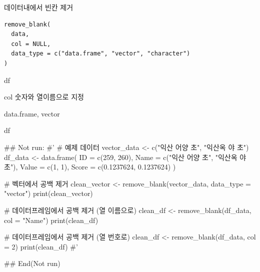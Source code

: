 \documentclass[a4paper]{book}
\begin{document}
%
\begin{Description}
데이터내에서 빈칸 제거
\end{Description}
%
\begin{Usage}
\begin{verbatim}
remove_blank(
  data,
  col = NULL,
  data_type = c("data.frame", "vector", "character")
)
\end{verbatim}
\end{Usage}
%
\begin{Arguments}
\begin{ldescription}
\item[\code{data}] df

\item[\code{col}] col 숫자와 열이름으로 지정

\item[\code{data\_type}] data.frame, vector
\end{ldescription}
\end{Arguments}
%
\begin{Value}
df
\end{Value}
%
\begin{Examples}
\begin{ExampleCode}
\#\# Not run: 
#'
# 예제 데이터
vector_data <- c("익산 어양 초", "익산옥 야 초")
df_data <- data.frame(
  ID = c(259, 260),
  Name = c("익산 어양 초", "익산옥 야 초"),
  Value = c(1, 1),
  Score = c(0.1237624, 0.1237624)
)

# 벡터에서 공백 제거
clean_vector <- remove_blank(vector_data, data_type = "vector")
print(clean_vector)

# 데이터프레임에서 공백 제거 (열 이름으로)
clean_df <- remove_blank(df_data, col = "Name")
print(clean_df)

# 데이터프레임에서 공백 제거 (열 번호로)
clean_df <- remove_blank(df_data, col = 2)
print(clean_df)
#'


## End(Not run)
\end{ExampleCode}
\end{Examples}
\end{document}
